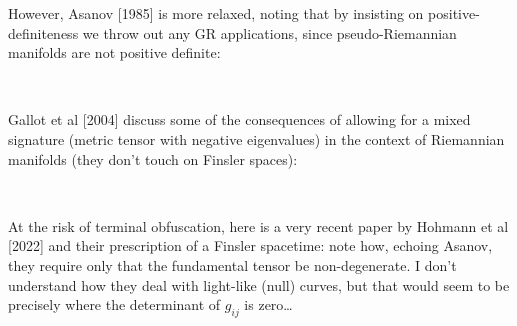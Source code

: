 \documentclass[11pt]{article}
\begin{document}
    However, Asanov {[}1985{]} is more relaxed, noting that by insisting on
positive-definiteness we throw out any GR applications, since
pseudo-Riemannian manifolds are not positive definite:

 
            
    
    \begin{center}
    \end{center}
    { \hspace*{\fill} \\}
    

    Gallot et al {[}2004{]} discuss some of the consequences of allowing for
a mixed signature (metric tensor with negative eigenvalues) in the
context of Riemannian manifolds (they don't touch on Finsler spaces):

 
            
    
    \begin{center}
    \end{center}
    { \hspace*{\fill} \\}
    

    At the risk of terminal obfuscation, here is a very recent paper by
Hohmann et al {[}2022{]} and their prescription of a Finsler spacetime:
note how, echoing Asanov, they require only that the fundamental tensor
be non-degenerate. I don't understand how they deal with light-like
(null) curves, but that would seem to be precisely where the determinant
of \(g_{ij}\) is zero\ldots{}

 
            
    
    \begin{center}
    \end{center}
    { \hspace*{\fill} \\}
    



    
    
    
\end{document}
